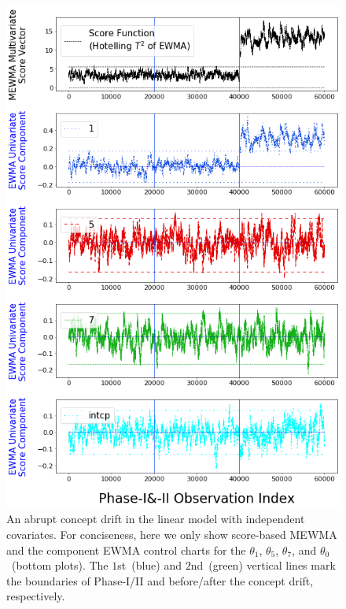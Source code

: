 \documentclass[twoside,11pt]{article}
\begin{document}
\begin{appendices}
\begin{figure}[!hpt]
\centering
  \includegraphics[width = 0.8\linewidth]{../figures/v14/sim_2/reg/neg_single_1_sim2_mlines_with_regu_1e-08_0_005.png}
  \caption{An abrupt concept drift in the linear model with independent covariates. For conciseness, here we only show score-based MEWMA and the component EWMA control charts for the $\theta_1$, $\theta_5$, $\theta_7$, and $\theta_0$~(bottom plots). The $1$st~(blue) and $2$nd~(green) vertical lines mark the boundaries of Phase-I/II and before/after the concept drift, respectively.}
  \label{fig:lin_reg_ind_X}
\end{figure}



\end{appendices}
\end{document}
